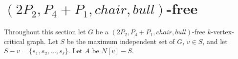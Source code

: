 \documentclass[11pt]{article}
\newtheorem{lemma}[theorem]{Lemma}
\theoremstyle{definition}
\newcommand{\noneighbs}{\overline{N[v]}}
\begin{document}
%
%

\section{$(2P_2, P_4 + P_1, chair, bull)$-free}
Throughout this section let $G$ be a $(2P_2, P_4 + P_1, chair, bull)$-free $k$-vertex-critical graph. Let $S$ be the maximum independent set of $G$, $v \in S$, and let $S-v=\{s_1,s_2,\dots,s_{\ell}\}$. Let $A$ be $\noneighbs - S$. 
\end{document}
